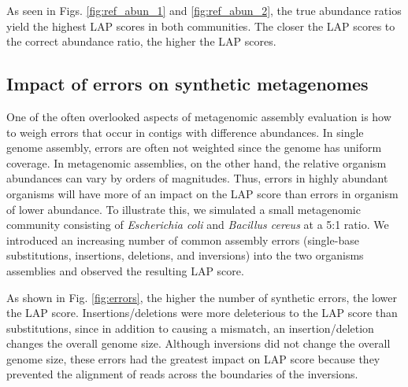 \documentclass[conference]{IEEEtran}
\begin{document}


As seen in Figs. \ref{fig:ref_abun_1} and \ref{fig:ref_abun_2}, the true abundance ratios yield the highest LAP scores in both communities.
The closer the LAP scores to the correct abundance ratio, the higher the LAP scores.

\subsection{Impact of errors on synthetic metagenomes}

One of the often overlooked aspects of metagenomic assembly evaluation is how to weigh errors that occur in contigs with difference abundances.
In single genome assembly, errors are often not weighted since the genome has uniform coverage.
In metagenomic assemblies, on the other hand, the relative organism abundances can vary by orders of magnitudes.
Thus, errors in highly abundant organisms will have more of an impact on the LAP score than errors in organism of lower abundance.
To illustrate this, we simulated a small metagenomic community consisting of \emph{Escherichia coli} and \emph{Bacillus cereus} at a 5:1 ratio.
We introduced an increasing number of common assembly errors (single-base substitutions, insertions, deletions, and inversions) into the two organisms assemblies and observed the resulting LAP score.

As shown in Fig. \ref{fig:errors}, the higher the number of synthetic errors, the lower the LAP score.
Insertions/deletions were more deleterious to the LAP score than substitutions, since in addition to causing a mismatch, an insertion/deletion changes the overall genome size.
Although inversions did not change the overall genome size, these errors had the greatest impact on LAP score because they prevented the alignment of reads across the boundaries of the inversions.
\end{document}

